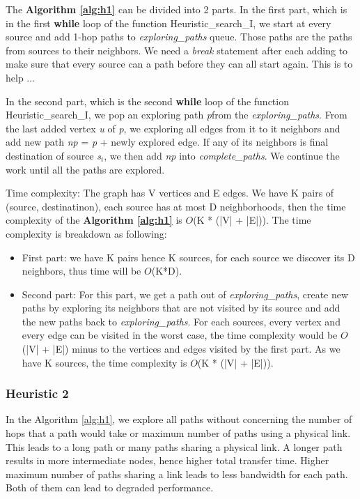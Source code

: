 The \textbf{Algorithm \ref{alg:h1}} can be divided into 2 parts. In the first part, which is in the first \textbf{while} loop of the function Heuristic\_search\_I, we start at every source and add 1-hop paths to \textit{exploring\_paths} queue. Those paths are the paths from sources to their neighbors. We need a \textit{break} statement after each adding to make sure that every source can a path before they can all start again. This is to help ...

In the second part, which is the second \textbf{while} loop of the function Heuristic\_search\_I, we pop an exploring path \textit{p}from the \textit{exploring\_paths}. From the last added vertex \textit{u} of \textit{p}, we exploring all edges from it to it neighbors and add new path \textit{np} = \textit{p} + newly explored edge. If any of its neighbors is final destination of source \textit{s$_i$}, we then add \textit{np} into \textit{complete\_paths}. We continue the work until all the paths are explored.

Time complexity: The graph has V vertices and E edges. We have K pairs of (source, destinatinon), each source has at most D neighborhoods, then the time complexity of the \textbf{Algorithm \ref{alg:h1}} is $O$(K * (|V| + |E|)). The time complexity is breakdown as following:
\begin{itemize}
\item First part: we have K pairs hence K sources, for each source we discover its D neighbors, thus time will be $O$(K*D).
\item Second part: For this part, we get a path out of \textit{exploring\_paths}, create new paths by exploring its neighbors that are not visited by its source and add the new paths back to \textit{exploring\_paths}. For each sources, every vertex and every edge can be visited in the worst case, the time complexity would be $O$(|V| + |E|) minus to the vertices and edges visited by the first part. As we have K sources, the time complexity is $O$(K * (|V| + |E|)).
\end{itemize}

\subsubsection{Heuristic 2}
In the Algorithm \ref{alg:h1}, we explore all paths without concerning the number of hops that a path would take or maximum number of paths using a physical link. This leads to a long path or many paths sharing a physical link. A longer path results in more intermediate nodes, hence higher total transfer time. Higher maximum number of paths sharing a link leads to less bandwidth for each path. Both of them can lead to degraded performance.

